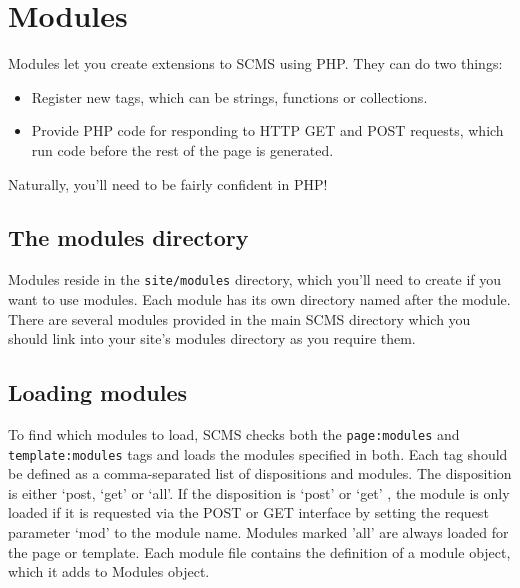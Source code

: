%
%
%
%
%
%
% 
%
% 
% 
%

\chapter{Modules}
\label{moduleschap}
Modules let you create extensions to SCMS using PHP. They can do two things:
\begin{itemize}
\item Register new tags, which can be strings, functions or collections.
\item Provide PHP code for responding to HTTP GET and POST requests, which 
run code before the rest of the page is generated.
\end{itemize}
Naturally, you'll need to be fairly confident in PHP!

\section{The modules directory}
Modules reside in the \texttt{site/modules} directory, which you'll
need to create if you want to use modules. Each module
has its own directory named after the module. There are several modules
provided in the main SCMS directory which you should link into your
site's modules directory as you require them.

\section{Loading modules}
To find which modules to load, SCMS checks both the \texttt{page:modules} and
\texttt{template:modules} tags and loads the modules specified in
both. Each tag should be defined as a comma-separated list of dispositions and modules. The disposition
is either `post, `get' or `all'. If the disposition is `post' or `get' , the module is only
loaded if it is requested via the POST or GET interface by setting the request parameter `mod' to the module name.
Modules marked 'all' are always loaded for the page or template.
Each module file contains the definition of a module object, which it adds to
Modules object.

